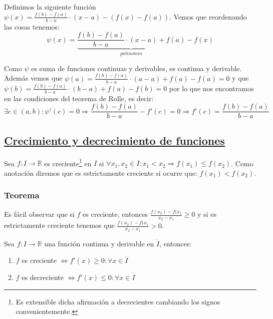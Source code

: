\documentclass[10pt,a4paper,openright]{book}
\begin{document}
Definimos la siguiente función $\psi(x)=\frac{f(b)-f(a)}{b-a}\cdot (x-a)-(f(x)-f(a))$. Vemos que reordenando las cosas tenemos:
$$\psi(x)=\underbrace{\frac{f(b)-f(a)}{b-a}\cdot (x-a)+f(a)}_{polinomio}-f(x)$$

Como $\psi$ es suma de funciones continuas y derivables, es continua y derivable. Además vemos que $\psi(a)=\frac{f(b)-f(a)}{b-a}\cdot (a-a)+f(a)-f(a)=0$ y que $\psi(b)=\frac{f(b)-f(a)}{b-a}\cdot (b-a)+f(a)-f(b)=0$ por lo que nos encontramos en las condiciones del teorema de Rolle, es decir:
$$\exists c\in (a,b): \psi'(c)=0\Rightarrow \frac{f(b)-f(a)}{b-a}-f'(c)=0\Rightarrow f'(c)=\frac{f(b)-f(a)}{b-a}$$

\subsection*{\underline{Crecimiento y decrecimiento de funciones}}
Sea $f:I\rightarrow \mathbb R$ es creciente\footnote{Es extensible dicha afirmación a decrecientes cambiando los signos convenientemente.} en $I$ si $\forall x_1, x_2\in I: x_1<x_2\Rightarrow f(x_1)\leq f(x_2)$. Como anotación diremos que es estrictamente creciente si ocurre que: $f(x_1)<f(x_2)$.

\subsubsection*{Teorema}
Es fácil observar que si $f$ es creciente, entonces $\frac{f(x_2)-f(x_1}{x_2-x_1}\geq 0$ y si es estrictamente creciente tenemos que $\frac{f(x_2)-f(x_1}{x_2-x_1}> 0$.

Sea $f:I\rightarrow\mathbb R$ una función continua y derivable en $\mathring{I}$, entonces:
\begin{enumerate}
\item $f$ es creciente $\Leftrightarrow f'(x)\geq 0: \forall x\in \mathring{I}$
\item $f$ es decreciente $\Leftrightarrow f'(x)\leq 0: \forall x\in \mathring{I}$
\end{enumerate}
\end{document}
